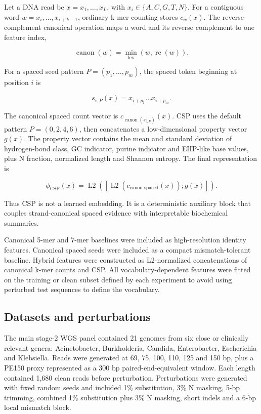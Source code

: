 \documentclass[10.5pt]{article}
\begin{document}
Let a DNA read be \(x = x_1,\ldots,x_L\), with \(x_i \in \{A,C,G,T,N\}\). For a contiguous word \(w=x_i,\ldots,x_{i+k-1}\), ordinary k-mer counting stores \(c_w(x)\). The reverse-complement canonical operation maps a word and its reverse complement to one feature index,


\[
\operatorname{canon}(w)=\min_{\mathrm{lex}}(w,\operatorname{rc}(w)).
\]

For a spaced seed pattern \(P=(p_1,\ldots,p_m)\), the spaced token beginning at position \(i\) is


\[
s_{i,P}(x)=x_{i+p_1}\ldots x_{i+p_m}.
\]

The canonical spaced count vector is \(c_{\operatorname{canon}(s_{i,P})}(x)\). CSP uses the default pattern \(P=(0,2,4,6)\), then concatenates a low-dimensional property vector \(g(x)\). The property vector contains the mean and standard deviation of hydrogen-bond class, GC indicator, purine indicator and EIIP-like base values, plus N fraction, normalized length and Shannon entropy. The final representation is


\[
\phi_{\mathrm{CSP}}(x)=\operatorname{L2}\left([\operatorname{L2}(c_{\operatorname{canon-spaced}}(x)); g(x)]\right).
\]

Thus CSP is not a learned embedding. It is a deterministic auxiliary block that couples strand-canonical spaced evidence with interpretable biochemical summaries.


Canonical 5-mer and 7-mer baselines were included as high-resolution identity features. Canonical spaced seeds were included as a compact mismatch-tolerant baseline. Hybrid features were constructed as L2-normalized concatenations of canonical k-mer counts and CSP. All vocabulary-dependent features were fitted on the training or clean subset defined by each experiment to avoid using perturbed test sequences to define the vocabulary.


\subsection*{Datasets and perturbations}

The main stage-2 WGS panel contained 21 genomes from six close or clinically relevant genera: Acinetobacter, Burkholderia, Candida, Enterobacter, Escherichia and Klebsiella. Reads were generated at 69, 75, 100, 110, 125 and 150 bp, plus a PE150 proxy represented as a 300 bp paired-end-equivalent window. Each length contained 1,680 clean reads before perturbation. Perturbations were generated with fixed random seeds and included 1\% substitution, 3\% N masking, 5-bp trimming, combined 1\% substitution plus 3\% N masking, short indels and a 6-bp local mismatch block.
\end{document}
